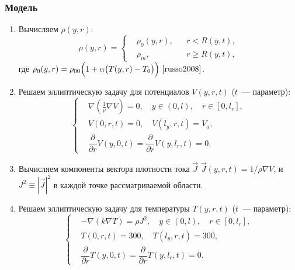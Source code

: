 \documentclass{beamer}
\begin{document}
\begin{frame}[allowframebreaks]
    \frametitle{Модель}
    \begin{enumerate}
        \item Вычисляем $\rho(y,r)$:
        \begin{equation*}
            \rho(y,r) =
            \left\{
            \begin{aligned}
                &\rho_0(y,r), &  &r < R(y,t),\\
                &\rho_m, & &r \geqslant R(y,t),
            \end{aligned}
            \right.
        \end{equation*}
        где $ \rho_0(y,r)=\rho_{00}\Big(1 + \alpha \big(T(y,r) - T_0\big) \Big)~\cite{russo2008}$.

    \item Решаем эллиптическую задачу для потенциалов $V(y,r,t)$ ($t$~--- параметр):
        \begin{equation*}
            \left\{
            \begin{aligned}
                &\nabla \left(\frac{1}{\rho}\nabla V\right) = 0, \quad y \in (0,l), \quad r \in [0,l_r],\\
                &V(0,r,t) = 0, \quad V(l_y,r,t) = V_a,\\
                &\dfrac{\partial}{\partial r}V(y,0,t) = \dfrac{\partial}{\partial r} V(y,l_r,t)=0,
            \end{aligned}
            \right.
        \end{equation*}

    \item Вычисляем компоненты вектора плотности тока $\vec{J}$ $\vec{J}(y,r,t) =1/\rho \nabla V$, и $J^2 \equiv |\vec{J}|^2$ в каждой точке рассматриваемой области.

    \item Решаем эллиптическую задачу для температуры $T(y,r,t)$ ($t$~--- параметр):
        \begin{equation*}
            \left\{
            \begin{aligned}
                &-\nabla (k\nabla T)= \rho J^2, \quad y \in (0,l), \quad r \in [0,l_r],\\
                &T(0,r,t) = 300, \quad T(l_y,r,t) = 300,\\
                &\dfrac{\partial}{\partial r}T(y,0,t) = \dfrac{\partial}{\partial r} T(y,l_r,t)=0.
            \end{aligned}
            \right.
        \end{equation*}


\end{enumerate}
\end{frame}
\end{document}
